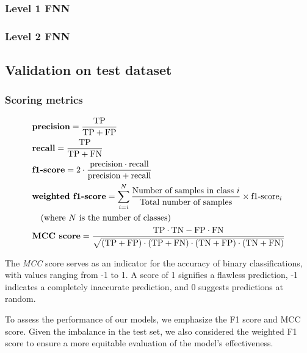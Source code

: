 \documentclass{bioinfo}
\begin{document}
\begin{methods}
\subsubsection{Level 1 FNN}
\subsubsection{Level 2 FNN}


\subsection{Validation on test dataset}

\subsubsection{Scoring metrics}



\begin{align}
	&\textbf{precision} = \frac{\text{TP}}{\text{TP} + \text{FP}} \\
    &\textbf{recall} = \frac{\text{TP}}{\text{TP} + \text{FN}} \\
    &\textbf{f1-score} = 2 \cdot \frac{\text{precision} \cdot \text{recall}}{\text{precision} + \text{recall}} \\
	& \textbf{weighted f1-score} = \operatornamewithlimits{\sum}^{N}_{i=i} \frac{\text{Number of samples in class }i}{\text{Total number of samples}}  \times \text{f1-score}_{i}\nonumber\\
	&\quad \text{(where $N$ is the number of classes)} \\
    &\textbf{MCC score} = \frac{\text{TP} \cdot \text{TN} - \text{FP} \cdot \text{FN}}{\sqrt{(\text{TP} + \text{FP}) \cdot (\text{TP} + \text{FN}) \cdot (\text{TN} + \text{FP}) \cdot (\text{TN} + \text{FN})}}
\end{align}

The \textit{MCC} score serves as an indicator for the accuracy of binary classifications, with values ranging from -1 to 1. A score of 1 signifies a flawless prediction, 
-1 indicates a completely inaccurate prediction, and 0 suggests predictions at random.  

To assess the performance of our models, we emphasize the F1 score and MCC score. 
Given the imbalance in the test set, we also considered the weighted F1 score to ensure a more equitable evaluation of the model's 
effectiveness.

\end{methods}
\end{document}
